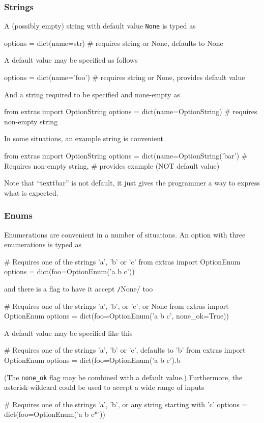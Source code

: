 \subsubsection*{Strings}
A (possibly empty) string with default value \texttt{None} is typed as
\begin{python}
options = dict(name=str)     # requires string or None, defaults to None
\end{python}
A default value may be specified as follows
\begin{python}
options = dict(name='foo')   # requires string or None, provides default value
\end{python}
And a string required to be specified and none-empty as
\begin{python}
from extras import OptionString
options = dict(name=OptionString)       # requires non-empty string
\end{python}
In some situations, an example string is convenient
\begin{python}
from extras import OptionString
options = dict(name=OptionString('bar') # Requires non-empty string,
                                        # provides example (NOT default value)

\end{python}
Note that ``textt{bar}'' is not default, it just gives the programmer
a way to express what is expected.



\subsubsection*{Enums}
Enumerations are convenient in a number of situations.  An option with
three enumerations is typed as
\begin{python}
# Requires one of the strings 'a', 'b' or 'c'
from extras import OptionEnum
options = dict(foo=OptionEnum('a b c'))
\end{python}
and there is a flag to have it accept \texttt/None/ too
\begin{python}
# Requires one of the strings 'a', 'b', or 'c'; or None
from extras import OptionEnum
options = dict(foo=OptionEnum('a b c', none_ok=True))
\end{python}
A default value may be specified like this
\begin{python}
# Requires one of the strings 'a', 'b' or 'c', defaults to 'b'
from extras import OptionEnum
options = dict(foo=OptionEnum('a b c').b
\end{python}
(The \texttt{none\_ok} flag may be combined with a default value.)
Furthermore, the asterisk-wildcard could be used to accept a wide
range of inputs
\begin{python}
# Requires one of the strings 'a', 'b', or any string starting with 'c'
options = dict(foo=OptionEnum('a b c*'))
\end{python}



